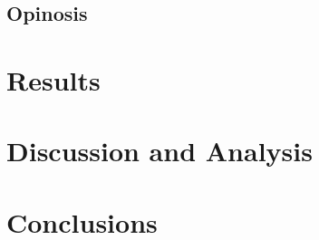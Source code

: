 \documentclass[paper=letter, fontsize=12pt]{article}
\begin{document}
\subsection{Opinosis}

\section{Results}

\section{Discussion and Analysis}

\section{Conclusions}



\end{document}
